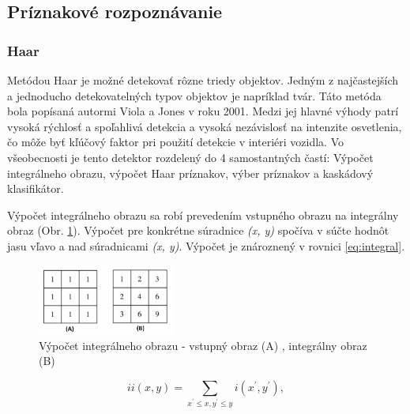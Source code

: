 \documentclass[slovak,master,dept460,male,cpp,cpdeclaration]{diploma}
\begin{document}
\subsection{Príznakové rozpoznávanie}
\label{Príznakové rozpoznávanie}
\subsubsection*{Haar}
Metódou Haar je možné detekovať rôzne triedy objektov. Jedným z najčastejších a jednoducho detekovatelných  typov objektov je napríklad tvár. Táto metóda bola popísaná autormi Viola a Jones\cite{viola2001rapid} v roku 2001. Medzi jej hlavné výhody patrí vysoká rýchlosť  a spoľahlivá detekcia a vysoká nezávislosť na intenzite osvetlenia, čo môže byť kľúčový faktor pri použití detekcie v interiéri vozidla. Vo všeobecnosti je tento detektor rozdelený do 4 samostantných častí: Výpočet integrálneho obrazu,  výpočet Haar príznakov, výber príznakov a kaskádový klasifikátor.\par Výpočet integrálneho obrazu sa robí prevedením vstupného obrazu na integrálny obraz (Obr. \ref{fig:integralImage}). Výpočet pre konkrétne súradnice \textit{(x, y)} spočíva v súčte hodnôt jasu vľavo a nad súradnicami  \textit{(x, y)}. Výpočet je znároznený v rovnici \ref{eq:integral}.


\begin{figure}[H]
	\centering
	\includegraphics[width=0.4\textwidth]{Figures/integralImage.png}
	\caption{Výpočet integrálneho obrazu - vstupný obraz (A) , integrálny obraz (B)}
	\label{fig:integralImage}
\end{figure}


\begin{equation}
ii(x,y)=\sum_{x^{\prime}\leq x,y^{\prime}\leq y}i(x^{\prime},y^{\prime}),
\label{eq:integral}
\end{equation}
\end{document}
